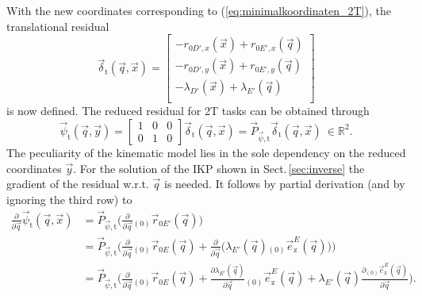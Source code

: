\documentclass[graybox,vecphys]{svmult}
\newcommand{\Res}[0]{\vec{\delta}}
\newcommand{\ResR}[0]{\vec{\psi}}
\begin{document}
With the new coordinates corresponding to (\ref{eq:minimalkoordinaten_2T}), the translational residual 
\begin{equation}
\label{eq:Phit}
\Res_\mathrm{t}(\vec{q},\vec{x})
=
\begin{bmatrix}
-r_{0D',x}(\vec{x}) + r_{0E',x}(\vec{q}) \\
-r_{0D',y}(\vec{x}) +r_{0E',y}(\vec{q}) \\
- {\lambda_{D'}(\vec{x})} + {\lambda_{E'}(\vec{q})} \\
\end{bmatrix}
\end{equation}
is now defined. %
The reduced residual for 2T tasks can be obtained through
\begin{equation}
\label{eq:Psit_2T}
\ResR_\mathrm{t}(\vec{q},\vec{y}) = %
\begin{bmatrix}
    1 & 0 & 0  \\ 
    0 & 1 & 0
    \end{bmatrix}
 \Res_\mathrm{t}(\vec{q},\vec{x})
 =\vec{P}_{\ResR,\mathrm{t}} \Res_\mathrm{t}(\vec{q},\vec{x})
 ~\in {\mathbb{R}^2}.
\end{equation} 
The peculiarity of the kinematic model lies in the sole dependency on the reduced coordinates $\vec{y}$.
For the solution of the IKP shown in Sect.\,\ref{sec:inverse} the gradient of the residual w.r.t. $\vec{q}$ is needed.
It follows by partial derivation (and by ignoring the third row) to
\begin{align}
{\frac{\partial}{\partial\vec{q}}\ResR_\mathrm{t}}(\vec{q},\vec{x}) &= \vec{P}_{\ResR,\mathrm{t}} {\Big(\frac{\partial}{\partial\vec{q}}{_{(0)}\vec{r}_{0E'}(\vec{q})}\Big)} \nonumber\\ &= \vec{P}_{\ResR,\mathrm{t}}
{\Big(\frac{\partial}{\partial\vec{q}}{_{(0)}\vec{r}_{0E}(\vec{q})}} + 
{\frac{\partial}{\partial\vec{q}}\big({\lambda_{E'}(\vec{q})}{_{(0)}\vec{e}_{\mathrm{z}}^E}(\vec{q})\big)\Big)} \label{eq:Phi_grad_2T2R_1}\\ &= \vec{P}_{\ResR,\mathrm{t}}
{\Big(\frac{\partial}{\partial\vec{q}}{_{(0)}\vec{r}_{0E}(\vec{q})}} + 
{\frac{\partial{\lambda_{E'}(\vec{q})}}{\partial\vec{q}}}{_{(0)}\vec{e}_{\mathrm{z}}^E}(\vec{q}) +
{{\lambda_{E'}(\vec{q})}\frac{\partial{_{(0)}\vec{e}_{\mathrm{z}}^E}(\vec{q})}{\partial\vec{q}}\Big)}. \label{eq:Phi_grad_2T2R_2}
\end{align}
\end{document}
